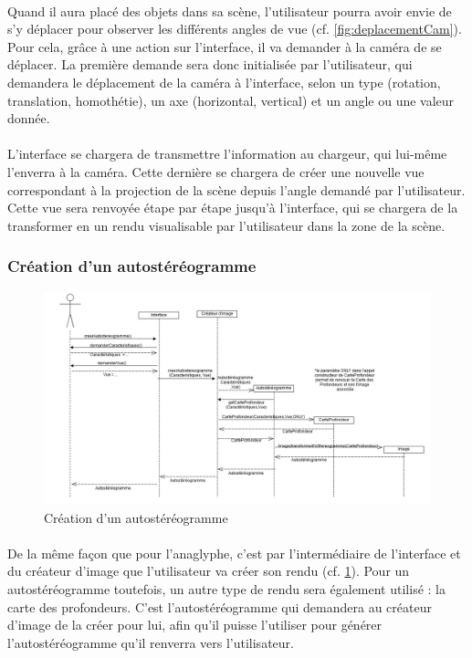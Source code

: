 \paragraph{}
Quand il aura placé des objets dans sa scène, l’utilisateur pourra avoir envie de s’y déplacer pour observer les différents angles de vue (cf. \ref{fig:deplacementCam}). Pour cela, grâce à une action sur l’interface, il va demander à la caméra de se déplacer. La première demande sera donc initialisée par l’utilisateur, qui demandera le déplacement de la caméra à l’interface, selon un type (rotation, translation, homothétie), un axe (horizontal, vertical) et un angle ou une valeur donnée.

\paragraph{}
L’interface se chargera de transmettre l’information au chargeur, qui lui-même l’enverra à la caméra. Cette dernière se chargera de créer une nouvelle vue correspondant à la projection de la scène depuis l’angle demandé par l’utilisateur. Cette vue sera renvoyée étape par étape jusqu’à l’interface, qui se chargera de la transformer en un rendu visualisable par l’utilisateur dans la zone de la scène.

\subsubsection{Création d'un autostéréogramme}

\begin{figure}[h]
		\centering
		\includegraphics[scale=0.3]{creerstereogramme.jpg}
		\caption{\label{fig:creerAutostereogramme} Création d'un autostéréogramme}
\end{figure}

\paragraph{}
De la même façon que pour l’anaglyphe, c’est par l’intermédiaire de l’interface et du créateur d’image que l’utilisateur va créer son rendu (cf. \ref{fig:creerAutostereogramme}). Pour un autostéréogramme toutefois, un autre type de rendu sera également utilisé : la carte des profondeurs. C’est l’autostéréogramme qui demandera au créateur d’image de la créer pour lui, afin qu’il puisse l’utiliser pour générer l’autostéréogramme qu’il renverra vers l’utilisateur.

